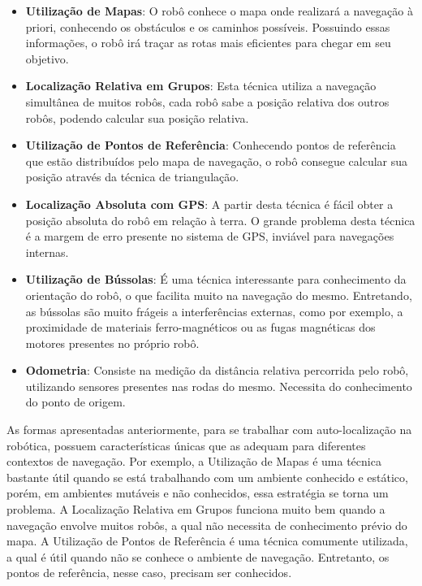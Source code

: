	\begin{itemize}
		\item \textbf{Utilização de Mapas}: O robô conhece o mapa onde realizará a navegação à priori, conhecendo os obstáculos e os caminhos possíveis. Possuindo essas informações, o robô irá traçar as rotas mais eficientes para chegar em seu objetivo.

		\item \textbf{Localização Relativa em Grupos}: Esta técnica utiliza a navegação simultânea de muitos robôs, cada robô sabe a posição relativa dos outros robôs, podendo calcular sua posição relativa.

		\item \textbf{Utilização de Pontos de Referência}: Conhecendo pontos de referência que estão distribuídos pelo mapa de navegação, o robô consegue calcular sua posição através da técnica de triangulação.

		\item \textbf{Localização Absoluta com GPS}: A partir desta técnica é fácil obter a posição absoluta do robô em relação à terra. O grande problema desta técnica é a margem de erro presente no sistema de GPS, inviável para navegações internas.

		\item \textbf{Utilização de Bússolas}: É uma técnica interessante para conhecimento da orientação do robô, o que facilita muito na navegação do mesmo. Entretando, as bússolas são muito frágeis a interferências externas, como por exemplo, a proximidade de materiais ferro-magnéticos ou as fugas magnéticas dos motores presentes no próprio robô.

		\item \textbf{Odometria}: Consiste na medição da distância relativa percorrida pelo robô, utilizando sensores presentes nas rodas do mesmo. Necessita do conhecimento do ponto de origem.
		 
	\end{itemize}

	As formas apresentadas anteriormente, para se trabalhar com auto-localização na robótica, possuem características únicas que as adequam para diferentes contextos de navegação. Por exemplo, a Utilização de Mapas é uma técnica bastante útil quando se está trabalhando com um ambiente conhecido e estático, porém, em ambientes mutáveis e não conhecidos, essa estratégia se torna um problema. A Localização Relativa em Grupos funciona muito bem quando a navegação envolve muitos robôs, a qual não necessita de conhecimento prévio do mapa. A Utilização de Pontos de Referência é uma técnica comumente utilizada, a qual é útil quando não se conhece o ambiente de navegação. Entretanto, os pontos de referência, nesse caso, precisam ser conhecidos. 

